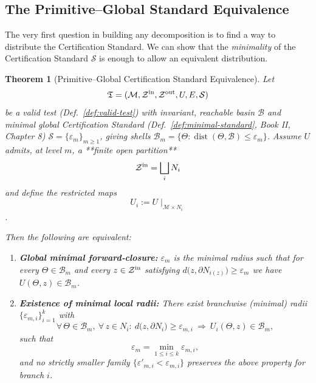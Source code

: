 \documentclass[12pt]{article}
\theoremstyle{definition}
\theoremstyle{plain}
\newtheorem{theorem}{Theorem}[section]
\begin{document}
\subsection{The Primitive–Global Standard Equivalence}
\label{subsec:primitive-global-equivalence}
The very first question in building any decomposition is to find a way to distribute the Certification Standard. We can show that the \emph{minimality} of the Certification Standard $\mathcal{S}$ is enough to allow an equivalent distribution.

\begin{theorem}[Primitive–Global Certification Standard Equivalence]
\label{thm:primitive-global-equivalence}
Let 
\[
  \mathfrak T=(\mathcal M,\mathcal Z^{\rm in},\mathcal Z^{\rm out},U,E,\mathcal S)
\]
be a valid test (Def.~\ref{def:valid-test}) with invariant, reachable basin \(\mathcal B\) and minimal global Certification Standard  (Def.~\ref{def:minimal-standard}, Book II, Chapter 8)
\(\mathcal S=\{\varepsilon_m\}_{m\ge1}\), giving shells \(\mathcal B_m=\{\Theta:\operatorname{dist}(\Theta,\mathcal B)\le\varepsilon_m\}\).
Assume $U$ admits, at level $m$, a **finite open partition** 
\[
\mathcal Z^{\rm in}=\bigsqcup_i N_i
\] 
and define the restricted maps 
\[
U_i:=U\!\mid_{\mathcal M\times N_i}
\].

Then the following are equivalent:

\begin{enumerate}[label=\textup{(\alph*)}, leftmargin=2em]
  \item \textbf{Global minimal forward‑closure:}  
  \(\varepsilon_m\) is the minimal radius such that for every \(\Theta\in\mathcal B_m\) and every \(z\in\mathcal Z^{\rm in}\) satisfying
  \(d\bigl(z,\partial N_{i(z)}\bigr)\ge\varepsilon_m\) we have \(U(\Theta,z)\in\mathcal B_m\).
  
  \item \textbf{Existence of minimal local radii:}  
  There exist branchwise (minimal) radii \(\{\varepsilon_{m,i}\}_{i=1}^k\) with
  \[
    \forall\,\Theta\in\mathcal B_m,\ \forall\,z\in N_i:\ 
       d\bigl(z,\partial N_i\bigr)\ge\varepsilon_{m,i}\ \Longrightarrow\ 
       U_i(\Theta,z)\in\mathcal B_m,
  \]
  such that 
  \[
    \varepsilon_m=\min_{1\le i\le k}\varepsilon_{m,i},
  \]
  and no strictly smaller family \(\{\varepsilon'_{m,i}<\varepsilon_{m,i}\}\) preserves the above property for branch \(i\).
\end{enumerate}
\end{theorem}
\end{document}
